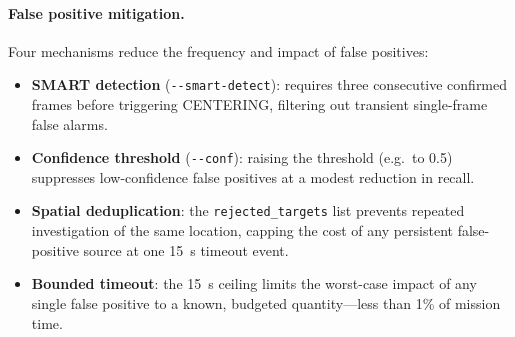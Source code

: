 \paragraph{False positive mitigation.}
Four mechanisms reduce the frequency and impact of false positives:
\begin{itemize}
  \item \textbf{SMART detection} (\texttt{-{}-smart-detect}): requires three consecutive confirmed frames before triggering CENTERING, filtering out transient single-frame false alarms.
  \item \textbf{Confidence threshold} (\texttt{-{}-conf}): raising the threshold (e.g.\ to 0.5) suppresses low-confidence false positives at a modest reduction in recall.
  \item \textbf{Spatial deduplication}: the \texttt{rejected\_targets} list prevents repeated investigation of the same location, capping the cost of any persistent false-positive source at one \SI{15}{\second} timeout event.
  \item \textbf{Bounded timeout}: the \SI{15}{\second} ceiling limits the worst-case impact of any single false positive to a known, budgeted quantity---less than 1\% of mission time.
\end{itemize}

